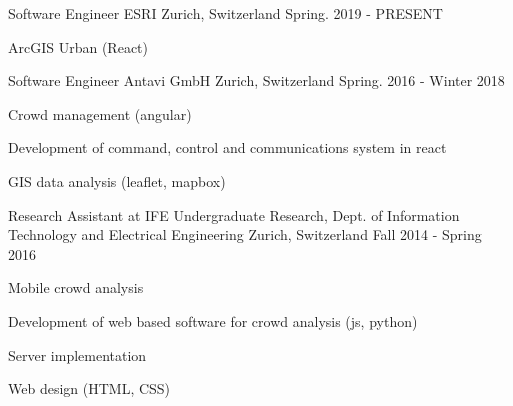 

\begin{cventries}

  \cventry
    {Software Engineer} %
    {ESRI} %
    {Zurich, Switzerland} %
    {Spring. 2019 - PRESENT} %
    {
      \begin{cvitems} %
        \item {ArcGIS Urban (React) }
      \end{cvitems}
    }

  \cventry
    {Software Engineer} %
    {Antavi GmbH} %
    {Zurich, Switzerland} %
    {Spring. 2016 - Winter 2018} %
    {
      \begin{cvitems} %
        \item {Crowd management (angular)}
        \item {Development of command, control and communications system in react }
        \item {GIS data analysis (leaflet, mapbox)}
      \end{cvitems}
    }

  \cventry
    {Research Assistant at IFE} %
    {Undergraduate Research, Dept. of Information Technology and Electrical Engineering} %
    {Zurich, Switzerland} %
    {Fall 2014 - Spring 2016} %
    {
      \begin{cvitems} %
        \item {Mobile crowd analysis }
        \item {Development of web based software for crowd analysis (js, python)}
        \item {Server implementation}
        \item {Web design (HTML, CSS)}
      \end{cvitems}
    }


\end{cventries}
